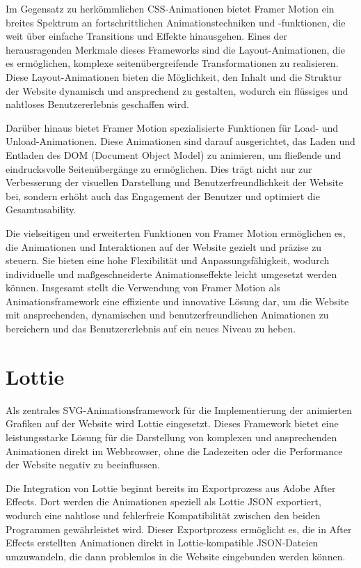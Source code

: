 Im Gegensatz zu herkömmlichen CSS-Animationen bietet Framer Motion ein breites Spektrum an fortschrittlichen 
Animationstechniken und -funktionen, die weit über einfache Transitions und Effekte hinausgehen. Eines der herausragenden 
Merkmale dieses Frameworks sind die Layout-Animationen, die es ermöglichen, komplexe seitenübergreifende Transformationen zu realisieren. 
Diese Layout-Animationen bieten die Möglichkeit, den Inhalt und die Struktur der Website dynamisch und ansprechend zu gestalten, 
wodurch ein flüssiges und nahtloses Benutzererlebnis geschaffen wird.

Darüber hinaus bietet Framer Motion spezialisierte Funktionen für Load- und Unload-Animationen. Diese Animationen sind darauf 
ausgerichtet, das Laden und Entladen des DOM (Document Object Model) zu animieren, um fließende und eindrucksvolle Seitenübergänge 
zu ermöglichen. Dies trägt nicht nur zur Verbesserung der visuellen Darstellung und Benutzerfreundlichkeit der Website bei, sondern 
erhöht auch das Engagement der Benutzer und optimiert die Gesamtusability.

Die vielseitigen und erweiterten Funktionen von Framer Motion ermöglichen es, die Animationen und Interaktionen auf der 
Website gezielt und präzise zu steuern. Sie bieten eine hohe Flexibilität und Anpassungsfähigkeit, wodurch individuelle und 
maßgeschneiderte Animationseffekte leicht umgesetzt werden können. Insgesamt stellt die Verwendung von Framer Motion als 
Animationsframework eine effiziente und innovative Lösung dar, um die Website mit ansprechenden, dynamischen und benutzerfreundlichen 
Animationen zu bereichern und das Benutzererlebnis auf ein neues Niveau zu heben.

\section{Lottie}
Als zentrales SVG-Animationsframework für die Implementierung der animierten Grafiken auf der Website wird Lottie eingesetzt. 
Dieses Framework bietet eine leistungsstarke Lösung für die Darstellung von komplexen und ansprechenden Animationen direkt im Webbrowser, 
ohne die Ladezeiten oder die Performance der Website negativ zu beeinflussen.

Die Integration von Lottie beginnt bereits im Exportprozess aus Adobe After Effects. Dort werden die Animationen speziell als Lottie JSON 
exportiert, wodurch eine nahtlose und fehlerfreie Kompatibilität zwischen den beiden Programmen gewährleistet wird. Dieser Exportprozess 
ermöglicht es, die in After Effects erstellten Animationen direkt in Lottie-kompatible JSON-Dateien umzuwandeln, die dann problemlos in die 
Website eingebunden werden können.

